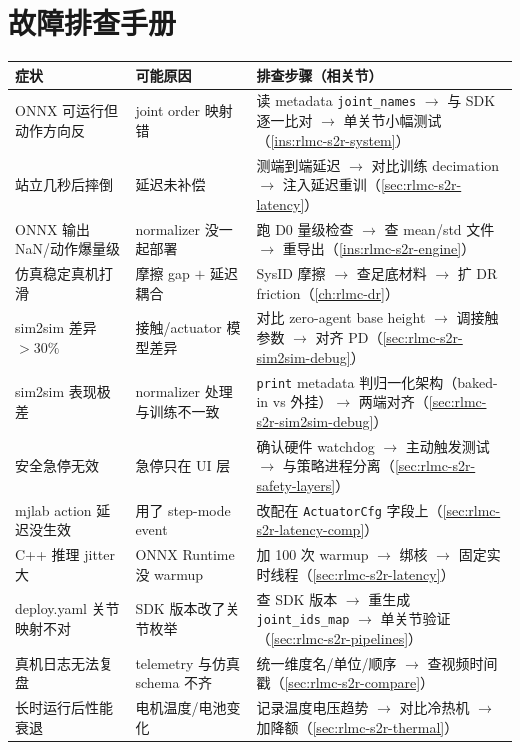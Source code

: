 \section*{故障排查手册}
\label{sec:rlmc-s2r-trouble}

\begin{center}
\small
\begin{tabular}{@{}p{3.4cm}p{3.6cm}p{4.8cm}@{}}
\toprule
症状 & 可能原因 & 排查步骤（相关节） \\
\midrule
ONNX 可运行但动作方向反 & joint order 映射错 & 读 metadata \verb|joint_names| $\to$ 与 SDK 逐一比对 $\to$ 单关节小幅测试（\cref{ins:rlmc-s2r-system}） \\
站立几秒后摔倒 & 延迟未补偿 & 测端到端延迟 $\to$ 对比训练 decimation $\to$ 注入延迟重训（\cref{sec:rlmc-s2r-latency}） \\
ONNX 输出 NaN/动作爆量级 & normalizer 没一起部署 & 跑 D0 量级检查 $\to$ 查 mean/std 文件 $\to$ 重导出（\cref{ins:rlmc-s2r-engine}） \\
仿真稳定真机打滑 & 摩擦 gap $+$ 延迟耦合 & SysID 摩擦 $\to$ 查足底材料 $\to$ 扩 DR friction（\cref{ch:rlmc-dr}） \\
sim2sim 差异 $>30\%$ & 接触/actuator 模型差异 & 对比 zero-agent base height $\to$ 调接触参数 $\to$ 对齐 PD（\cref{sec:rlmc-s2r-sim2sim-debug}） \\
sim2sim 表现极差 & normalizer 处理与训练不一致 & \verb|print| metadata 判归一化架构（baked-in vs 外挂）$\to$ 两端对齐（\cref{sec:rlmc-s2r-sim2sim-debug}） \\
安全急停无效 & 急停只在 UI 层 & 确认硬件 watchdog $\to$ 主动触发测试 $\to$ 与策略进程分离（\cref{sec:rlmc-s2r-safety-layers}） \\
mjlab action 延迟没生效 & 用了 step-mode event & 改配在 \verb|ActuatorCfg| 字段上（\cref{sec:rlmc-s2r-latency-comp}） \\
C++ 推理 jitter 大 & ONNX Runtime 没 warmup & 加 100 次 warmup $\to$ 绑核 $\to$ 固定实时线程（\cref{sec:rlmc-s2r-latency}） \\
deploy.yaml 关节映射不对 & SDK 版本改了关节枚举 & 查 SDK 版本 $\to$ 重生成 \verb|joint_ids_map| $\to$ 单关节验证（\cref{sec:rlmc-s2r-pipelines}） \\
真机日志无法复盘 & telemetry 与仿真 schema 不齐 & 统一维度名/单位/顺序 $\to$ 查视频时间戳（\cref{sec:rlmc-s2r-compare}） \\
长时运行后性能衰退 & 电机温度/电池变化 & 记录温度电压趋势 $\to$ 对比冷热机 $\to$ 加降额（\cref{sec:rlmc-s2r-thermal}） \\
\bottomrule
\end{tabular}
\end{center}

